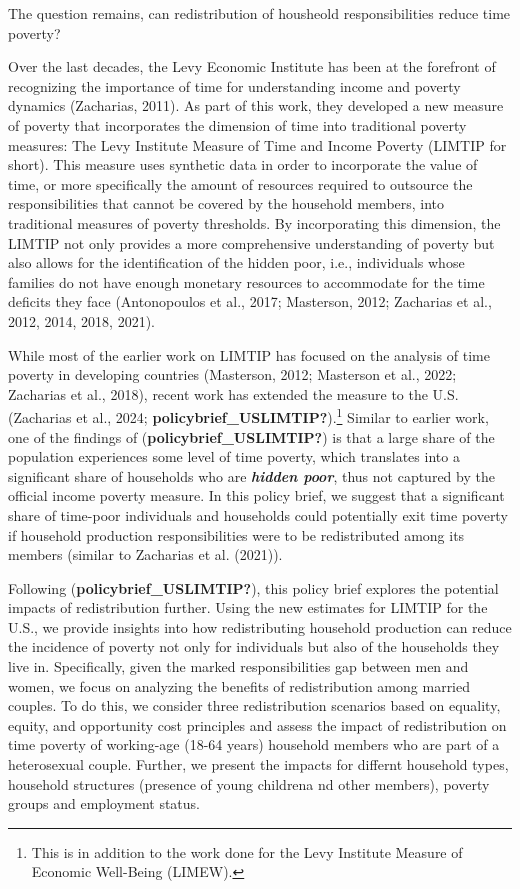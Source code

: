 \documentclass[
  11pt,
]{article}
\begin{document}
The question remains, can redistribution of housheold responsibilities
reduce time poverty?

Over the last decades, the Levy Economic Institute has been at the
forefront of recognizing the importance of time for understanding income
and poverty dynamics (Zacharias, 2011). As part of this work, they
developed a new measure of poverty that incorporates the dimension of
time into traditional poverty measures: The Levy Institute Measure of
Time and Income Poverty (LIMTIP for short). This measure uses synthetic
data in order to incorporate the value of time, or more specifically the
amount of resources required to outsource the responsibilities that
cannot be covered by the household members, into traditional measures of
poverty thresholds. By incorporating this dimension, the LIMTIP not only
provides a more comprehensive understanding of poverty but also allows
for the identification of the hidden poor, i.e., individuals whose
families do not have enough monetary resources to accommodate for the
time deficits they face (Antonopoulos et al., 2017; Masterson, 2012;
Zacharias et al., 2012, 2014, 2018, 2021).

While most of the earlier work on LIMTIP has focused on the analysis of
time poverty in developing countries (Masterson, 2012; Masterson et al.,
2022; Zacharias et al., 2018), recent work has extended the measure to
the U.S. (Zacharias et al., 2024;
\textbf{policybrief\_USLIMTIP?}).\footnote{This is in addition to the
  work done for the Levy Institute Measure of Economic Well-Being
  (LIMEW).} Similar to earlier work, one of the findings of
(\textbf{policybrief\_USLIMTIP?}) is that a large share of the
population experiences some level of time poverty, which translates into
a significant share of households who are \textbf{\emph{hidden poor}},
thus not captured by the official income poverty measure. In this policy
brief, we suggest that a significant share of time-poor individuals and
households could potentially exit time poverty if household production
responsibilities were to be redistributed among its members (similar to
Zacharias et al. (2021)).

Following (\textbf{policybrief\_USLIMTIP?}), this policy brief explores
the potential impacts of redistribution further. Using the new estimates
for LIMTIP for the U.S., we provide insights into how redistributing
household production can reduce the incidence of poverty not only for
individuals but also of the households they live in. Specifically, given
the marked responsibilities gap between men and women, we focus on
analyzing the benefits of redistribution among married couples. To do
this, we consider three redistribution scenarios based on equality,
equity, and opportunity cost principles and assess the impact of
redistribution on time poverty of working-age (18-64 years) household
members who are part of a heterosexual couple. Further, we present the
impacts for differnt household types, household structures (presence of
young childrena nd other members), poverty groups and employment status.
\end{document}
